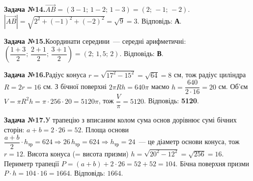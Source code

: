 \documentclass[12pt]{article}
\begin{document}
\par\vspace{0.3cm}\noindent\hypertarget{sol:14}{}
\begin{tcolorbox}[colback=titleBg!40, colframe=mainGreen!55, boxrule=0.4pt, arc=2pt, left=6pt, right=6pt, top=4pt, bottom=4pt, breakable]
\noindent\small\textbf{Задача №14.}\quad $\overrightarrow{AB}=(3-1;\,1-2;\,1-3)=(2;\,-1;\,-2)$. $|\overrightarrow{AB}|=\sqrt{2^2+(-1)^2+(-2)^2}=\sqrt{9}=3$. Відповідь: \textbf{А}.
\par\vspace{0.1cm}\hfill\hyperlink{task:14}{}
\end{tcolorbox}
\par\vspace{0.3cm}\noindent\hypertarget{sol:15}{}
\begin{tcolorbox}[colback=titleBg!40, colframe=mainGreen!55, boxrule=0.4pt, arc=2pt, left=6pt, right=6pt, top=4pt, bottom=4pt, breakable]
\noindent\small\textbf{Задача №15.}\quad Координати середини~--- середні арифметичні: $\left(\dfrac{1+3}{2};\,\dfrac{2+1}{2};\,\dfrac{3+1}{2}\right)=(2;\,1{,}5;\,2)$. Відповідь: \textbf{В}.
\par\vspace{0.1cm}\hfill\hyperlink{task:15}{}
\end{tcolorbox}
\par\vspace{0.3cm}\noindent\hypertarget{sol:16}{}
\begin{tcolorbox}[colback=titleBg!40, colframe=mainGreen!55, boxrule=0.4pt, arc=2pt, left=6pt, right=6pt, top=4pt, bottom=4pt, breakable]
\noindent\small\textbf{Задача №16.}\quad Радіус конуса $r=\sqrt{17^2-15^2}=\sqrt{64}=8$ см, тож радіус циліндра $R=2r=16$ см. З бічної поверхні $2\pi R h=640\pi$ маємо $h=\dfrac{640}{2\cdot 16}=20$ см. Об'єм $V=\pi R^2 h=\pi\cdot 256\cdot 20=5120\pi$, тож $\dfrac{V}{\pi}=5120$. Відповідь: \textbf{5120}.
\par\vspace{0.1cm}\hfill\hyperlink{task:16}{}
\end{tcolorbox}
\par\vspace{0.3cm}\noindent\hypertarget{sol:17}{}
\begin{tcolorbox}[colback=titleBg!40, colframe=mainGreen!55, boxrule=0.4pt, arc=2pt, left=6pt, right=6pt, top=4pt, bottom=4pt, breakable]
\noindent\small\textbf{Задача №17.}\quad У трапецію з вписаним колом сума основ дорівнює сумі бічних сторін: $a+b=2\cdot26=52$. Площа основи $\dfrac{a+b}{2}\cdot h_{\text{тр}}=624\Rightarrow 26\,h_{\text{тр}}=624\Rightarrow h_{\text{тр}}=24$~--- це діаметр основи конуса, тож $r=12$. Висота конуса (= висота призми) $h=\sqrt{20^2-12^2}=\sqrt{256}=16$. Периметр трапеції $P=(a+b)+2\cdot26=52+52=104$. Бічна поверхня призми $P\cdot h=104\cdot16=1664$. Відповідь: $1664$.
\par\vspace{0.1cm}\hfill\hyperlink{task:17}{}
\end{tcolorbox}
\end{document}
